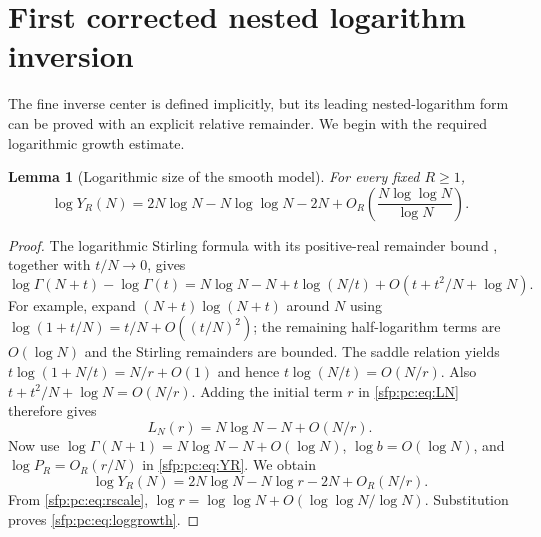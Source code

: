 \documentclass[11pt,letterpaper]{article}
\numberwithin{equation}{section}
\newtheorem{lemma}[theorem]{Lemma}
\theoremstyle{definition}\newtheorem{definition}[theorem]{Definition}
\theoremstyle{remark}\newtheorem{remark}[theorem]{Remark}
\begin{document}
\section{First corrected nested logarithm inversion}\label{sfp:pc:sec:nested}

The fine inverse center is defined implicitly, but its leading
nested-logarithm form can be proved with an explicit relative
remainder. We begin with the required logarithmic growth estimate.

\begin{lemma}[Logarithmic size of the smooth model]\label{sfp:pc:lem:loggrowth}
For every fixed $R\geq1$,
\begin{equation}\label{sfp:pc:eq:loggrowth}
 \log Y_R(N)
 =2N\log N-N\log\log N-2N
   +O_R\left(\frac{N\log\log N}{\log N}\right).
\end{equation}
\end{lemma}
\begin{proof}
The logarithmic Stirling formula with its positive-real remainder
bound \cite[5.11.1 and 5.11(ii)]{dlmf}, together with $t/N\to0$,
gives
\begin{equation}\label{sfp:pc:eq:Stirlingratio}
 \log\Gamma(N+t)-\log\Gamma(t)
 =N\log N-N+t\log(N/t)
      +O(t+t^2/N+\log N).
\end{equation}
For example, expand $(N+t)\log(N+t)$ around $N$ using
$\log(1+t/N)=t/N+O((t/N)^2)$; the remaining half-logarithm
terms are $O(\log N)$ and the Stirling remainders are bounded.
The saddle relation yields
$t\log(1+N/t)=N/r+O(1)$ and hence
$t\log(N/t)=O(N/r)$. Also
$t+t^2/N+\log N=O(N/r)$.
Adding the initial term $r$ in \eqref{sfp:pc:eq:LN} therefore gives
\[
 L_N(r)=N\log N-N+O(N/r).
\]
Now use
$\log\Gamma(N+1)=N\log N-N+O(\log N)$,
$\log b=O(\log N)$, and $\log P_R=O_R(r/N)$ in
\eqref{sfp:pc:eq:YR}. We obtain
\begin{equation}\label{sfp:pc:eq:loggrowthr}
 \log Y_R(N)=2N\log N-N\log r-2N+O_R(N/r).
\end{equation}
From \eqref{sfp:pc:eq:rscale},
$\log r=\log\log N+O(\log\log N/\log N)$.
Substitution proves \eqref{sfp:pc:eq:loggrowth}.
\end{proof}
\end{document}
